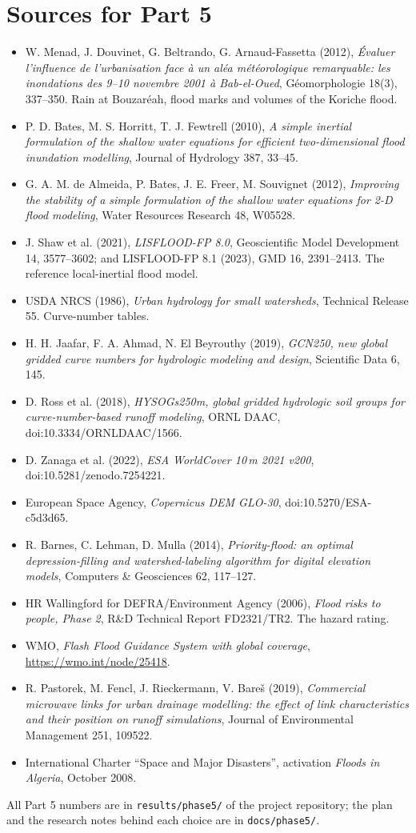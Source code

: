 \section{Sources for Part 5}
\small
\begin{itemize}
\item W. Menad, J. Douvinet, G. Beltrando, G. Arnaud-Fassetta (2012), \emph{Évaluer l'influence de l'urbanisation face à
un aléa météorologique remarquable: les inondations des 9--10 novembre 2001 à Bab-el-Oued}, Géomorphologie 18(3),
337--350. Rain at Bouzaréah, flood marks and volumes of the Koriche flood.
\item P. D. Bates, M. S. Horritt, T. J. Fewtrell (2010), \emph{A simple inertial formulation of the shallow water
equations for efficient two-dimensional flood inundation modelling}, Journal of Hydrology 387, 33--45.
\item G. A. M. de Almeida, P. Bates, J. E. Freer, M. Souvignet (2012), \emph{Improving the stability of a simple formulation
of the shallow water equations for 2-D flood modeling}, Water Resources Research 48, W05528.
\item J. Shaw et al. (2021), \emph{LISFLOOD-FP 8.0}, Geoscientific Model Development 14, 3577--3602; and LISFLOOD-FP 8.1
(2023), GMD 16, 2391--2413. The reference local-inertial flood model.
\item USDA NRCS (1986), \emph{Urban hydrology for small watersheds}, Technical Release 55. Curve-number tables.
\item H. H. Jaafar, F. A. Ahmad, N. El Beyrouthy (2019), \emph{GCN250, new global gridded curve numbers for hydrologic
modeling and design}, Scientific Data 6, 145.
\item D. Ross et al. (2018), \emph{HYSOGs250m, global gridded hydrologic soil groups for curve-number-based runoff
modeling}, ORNL DAAC, doi:10.3334/ORNLDAAC/1566.
\item D. Zanaga et al. (2022), \emph{ESA WorldCover 10\,m 2021 v200}, doi:10.5281/zenodo.7254221.
\item European Space Agency, \emph{Copernicus DEM GLO-30}, doi:10.5270/ESA-c5d3d65.
\item R. Barnes, C. Lehman, D. Mulla (2014), \emph{Priority-flood: an optimal depression-filling and watershed-labeling
algorithm for digital elevation models}, Computers \& Geosciences 62, 117--127.
\item HR Wallingford for DEFRA/Environment Agency (2006), \emph{Flood risks to people, Phase 2}, R\&D Technical Report
FD2321/TR2. The hazard rating.
\item WMO, \emph{Flash Flood Guidance System with global coverage}, \url{https://wmo.int/node/25418}.
\item R. Pastorek, M. Fencl, J. Rieckermann, V. Bareš (2019), \emph{Commercial microwave links for urban drainage
modelling: the effect of link characteristics and their position on runoff simulations}, Journal of Environmental
Management 251, 109522.
\item International Charter ``Space and Major Disasters'', activation \emph{Floods in Algeria}, October 2008.
\end{itemize}
All Part 5 numbers are in \texttt{results/phase5/} of the project repository; the plan and the research notes behind
each choice are in \texttt{docs/phase5/}.
\normalsize
